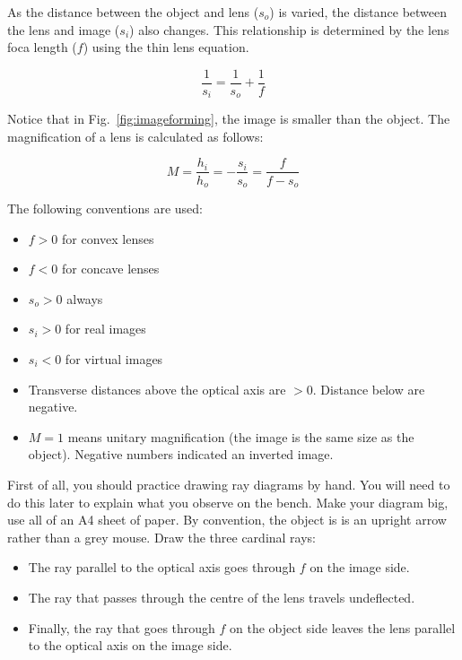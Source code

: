 \documentclass[a4paper]{report}
\begin{document}
As the distance between the object and lens ($s_o$) is varied, the distance between the lens and image ($s_i$) also changes. This relationship is determined by the lens foca length ($f$) using the thin lens equation.

\begin{equation}
\frac{1}{s_i}=\frac{1}{s_o}+\frac{1}{f}
\label{eq:thinlens}
\end{equation}

Notice that in Fig.~\ref{fig:imageforming}, the image is smaller than the object. The magnification of a lens is calculated as follows:

\begin{equation}
M = \frac{h_i}{h_o} = -\frac{s_i}{s_o} = \frac{f}{f-s_o}
\label{eq:mag}
\end{equation}

The following conventions are used:
\begin{itemize}
\item $f>0$ for convex lenses
\item $f<0$ for concave lenses
\item $s_o>0$ always
\item $s_i>0$ for real images
\item $s_i<0$ for virtual images
\item Transverse distances above the optical axis are $>0$. Distance
  below are negative. 
\item $M=1$ means unitary magnification (the image is the same size as
  the object). Negative numbers indicated an inverted image.
\end{itemize}

First of all, you should practice drawing ray diagrams by hand. 
You will need to do this later to explain what you observe on the bench.
Make your diagram big, use all of an A4 sheet of paper. 
By convention, the object is is an upright arrow rather than a grey mouse.
Draw the three cardinal rays:
\begin{itemize}
\item The ray parallel to the optical axis goes through $f$ on the image side.
\item The ray that passes through the centre of the lens travels undeflected.
\item Finally, the ray that goes through $f$ on the object side leaves the lens parallel to the optical axis on the image side. 
\end{itemize}
\end{document}
